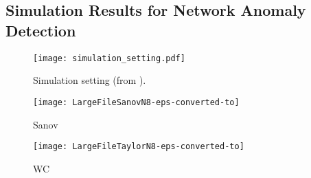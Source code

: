 \documentclass[10pt, twocolumn]{IEEEtran}
\begin{document}
%


\subsection{Simulation Results for Network Anomaly Detection} \label{sec:simuNet}

\begin{figure}[thpb]
   \centering
   \texttt{[image: simulation\_setting.pdf]}
   \caption{Simulation setting (from \cite{robust-anomaly-tcns}).}
\label{simulation_setting}
\end{figure}

\begin{figure*}[t]  
	\centering
	\begin{subfigure}[b]{0.495\textwidth}
		\texttt{[image: LargeFileSanovN8-eps-converted-to]}
		\caption{Sanov}
		\label{LargeFileSanovN8}
	\end{subfigure} 
	\begin{subfigure}[b]{0.495\textwidth}
		\texttt{[image: LargeFileTaylorN8-eps-converted-to]}
		\caption{WC}
		\label{LargeFileTaylorN8}
	\end{subfigure}   
	\caption{Detection results for Scenario \ref{sec:simuNet}-1 with
		$w_{\text{d}} = 50$ s, $w_{\text{s}} = 200$ s, $k =2$, $n_1 = 1$, $n_2 = 2$,
		$n_3 = 2$; (a) threshold is estimated by use of Sanov's
		theorem; (b) threshold is estimated by use of the weak convergence
		result.}
\end{figure*}
\end{document}
